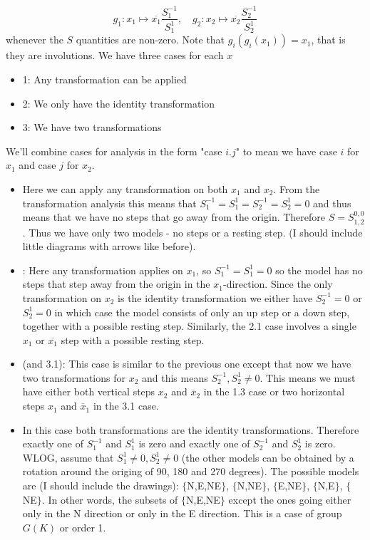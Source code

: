 \documentclass[12pt]{article}
\theoremstyle{definition} \newtheorem{definition}[theorem]{Definition}
\newcommand{\ol}[1]{\overline{#1}}
\newcommand{\Sf}[1]{S_{1,2}^{#1}}
\begin{document}
\[
	g_1 : x_1 \mapsto \ol{x_1}\frac{S_1^{-1}}{S_1^{1}},\quad g_2 : x_2 \mapsto \ol{x_2}\frac{S_2^{-1}}{S_2^{1}}
\]
whenever the $S$ quantities are non-zero. Note that $g_i(g_i(x_1)) = x_1$, that is they are involutions. We have three cases for each $x$
\begin{itemize}
\item 1: Any transformation can be applied
\item 2: We only have the identity transformation
\item 3: We have two transformations
 \end{itemize}
 We'll combine cases for analysis in the form "case $i.j$" to mean we have case $i$ for $x_1$ and case $j$ for $x_2$.

\begin{itemize}
\item [Case 1.1:] Here we can apply any transformation on both $x_1$ and $x_2$. From the transformation analysis this means that $S_1^{-1} = S_1^1 = S_2^{-1} = S_2^1 = 0$ and thus means that we have no steps that go away from the origin. Therefore $S = \Sf{0,0}$. Thus we have only two models - no steps or a resting step. (I should include little diagrams with arrows like before).
\item[Case 1.2]: Here any transformation applies on $x_1$, so $S_1^{-1} = S_1^1 = 0$ so the model has no steps that step away from the origin in the $x_1$-direction. Since the only transformation on $x_2$ is the identity transformation we either have $S_2^{-1} = 0$ or $S_2^1 = 0$ in which case the model consists of only an up step or a down step, together with a possible resting step. Similarly, the 2.1 case involves a single $x_1$ or $\ol{x_1}$ step with a possible resting step.
\item[Case 1.3:] (and 3.1): This case is similar to the previous one except that now we have two transformations for $x_2$ and this means $S_2^{-1}, S_2^1 \neq 0$. This means we must have either both vertical steps $x_2$ and $\ol{x}_2$ in the 1.3 case or two horizontal steps $x_1$ and $\ol{x}_1$ in the 3.1 case.
\item[Case 2.2:] In this case both transformations are the identity transformations. Therefore exactly one of $S_1^{-1}$ and $S_1^1$ is zero and exactly one of $S_2^{-1}$ and $S_2^1$ is zero. WLOG, assume that $S_1^1 \neq 0, S_2^1 \neq 0$ (the other models can be obtained by a rotation around the origing of 90, 180 and 270 degrees). The possible models are (I should include the drawings): $\{$N,E,NE$\}$, $\{$N,NE$\}$, $\{$E,NE$\}$, $\{$N,E$\}$, $\{$NE$\}$. In other words, the subsets of $\{$N,E,NE$\}$ except the ones going either only in the N direction or only in the E direction. This is a case of group $G(K)$ or order 1.

\end{itemize}
\end{document}
